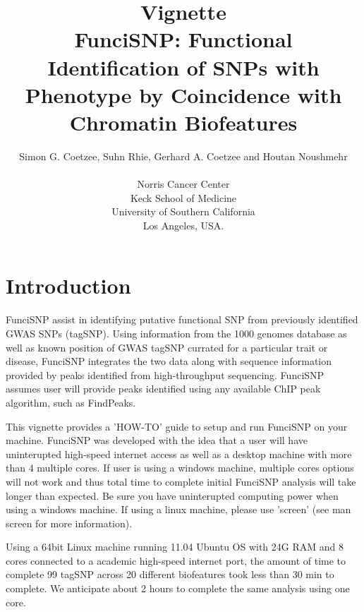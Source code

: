 \documentclass[a4paper]{article}
\begin{document}
\title{Vignette\\FunciSNP: Functional Identification of SNPs with
\\Phenotype by Coincidence with Chromatin Biofeatures}
\author{Simon G. Coetzee, Suhn Rhie, Gerhard A. Coetzee and Houtan 
Noushmehr\\\\Norris Cancer Center\\Keck School of Medicine\\University
 of Southern California\\Los Angeles, USA.
}

\maketitle
\section*{Introduction}
FunciSNP assist in identifying putative functional SNP from previously
 identified GWAS SNPs (tagSNP). Using information from the 1000 genomes 
 database as well as known position of GWAS tagSNP currated for a particular 
 trait or disease, FunciSNP integrates the two data along with sequence 
 information provided by peaks identified from high-throughput sequencing. 
 FunciSNP assumes user will provide peaks identified using any available 
 ChIP peak algorithm, such as FindPeaks.

This vignette provides a 'HOW-TO' guide to setup and run FunciSNP on your 
machine. FunciSNP was developed with the idea that a user will have 
uninterupted high-speed internet access as well as a desktop machine with 
more than 4 multiple cores. If user is using a windows machine, multiple
 cores options will not work and thus total time to complete initial FunciSNP
  analysis will take longer than expected. Be sure you have uninterupted 
  computing power when using a windows machine. If using a linux machine, 
  please use 'screen' (see man screen for more information).

Using a 64bit Linux machine running 11.04 Ubuntu OS with 24G RAM and 8 cores
 connected to a academic high-speed internet port, the amount of time to 
 complete 99 tagSNP across 20 different biofeatures took less than 30 min
 to complete. We anticipate about 2 hours to complete the same analysis 
 using one core.
\end{document}
